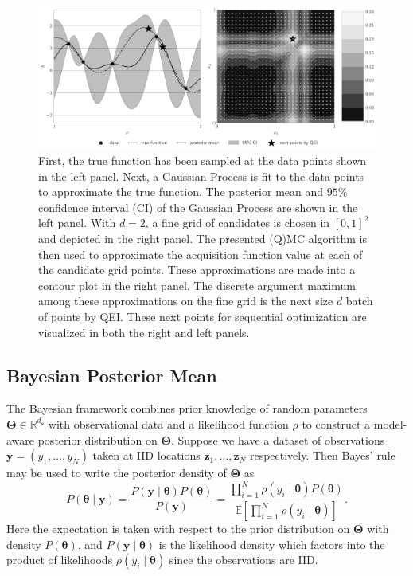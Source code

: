 \documentclass[graybox]{svmult}
\begin{document}
\begin{figure}[t]
    \centering
    \includegraphics[width=\textwidth]{figs/gp.pdf}
    \caption{First, the true function has been sampled at the data points shown in the left panel. Next, a Gaussian Process is fit to the data points to approximate the true function. The posterior mean and $95\%$ confidence interval (CI) of the Gaussian Process are shown in the left panel. With $d=2$, a fine grid of candidates is chosen in $[0,1]^{2}$ and depicted in the right panel. The presented (Q)MC algorithm is then used to approximate the acquisition function value at each of the candidate grid points. These approximations are made into a contour plot in the right panel. The discrete argument maximum among these approximations on the fine grid is the next size $d$ batch of points by QEI. These next points for sequential optimization are visualized in both the right and left panels.}
    \label{SoRa_fig:bo_qei}
\end{figure}

\subsection{Bayesian Posterior Mean}

The Bayesian framework combines prior knowledge of random parameters $\boldsymbol{\Theta} \in \mathbb{R}^{d_{\boldsymbol{s}}}$ with observational data and a likelihood function $\rho$ to construct a model-aware posterior distribution on $\boldsymbol{\Theta}$. Suppose we have a dataset of observations $\boldsymbol{y} = (y_1,\dots,y_{N})$ taken at IID locations $\boldsymbol{z}_1,\dots,\boldsymbol{z}_{N}$ respectively. Then Bayes' rule may be used to write the posterior density of $\boldsymbol{\Theta}$ as 
$$P\left(\boldsymbol{\theta} \mid \boldsymbol{y} \right) = \frac{P(\boldsymbol{y} \mid \boldsymbol{\theta}) P(\boldsymbol{\theta})}{P\left(\boldsymbol{y}\right)} = \frac{\prod_{i=1}^{N} \rho(y_i \mid \boldsymbol{\theta}) P(\boldsymbol{\theta})}{\mathbb{E}\left[\prod_{i=1}^{N} \rho(y_i \mid \boldsymbol{\theta})\right]}.$$
Here the expectation is taken with respect to the prior distribution on $\boldsymbol{\Theta}$ with density $P(\boldsymbol{\theta})$, and $P\left(\boldsymbol{y} \mid \boldsymbol{\theta} \right)$ is the likelihood density which factors into the product of likelihoods $\rho(y_i \mid \boldsymbol{\theta})$ since the observations are IID. 
\end{document}
